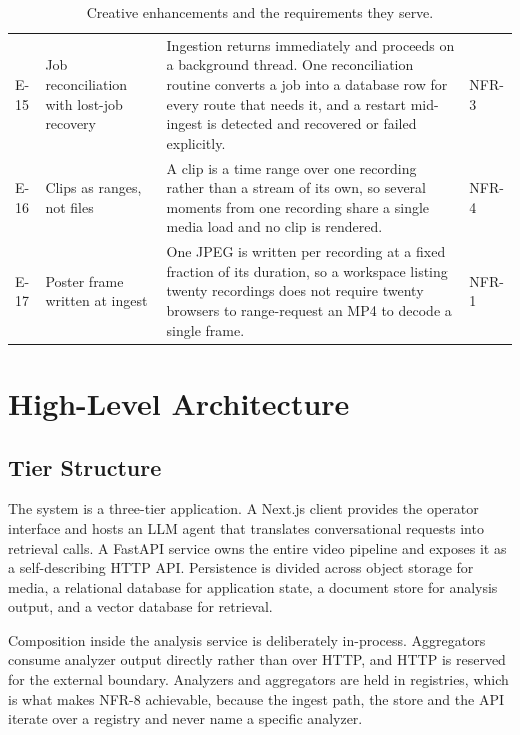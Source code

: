 \documentclass[11pt,a4paper]{article}
\begin{document}
\begin{table}[htbp]
\begin{tabularx}{\textwidth}{@{}lL{3.2cm}XL{1.2cm}@{}}
E-15 & Job reconciliation with lost-job recovery &
Ingestion returns immediately and proceeds on a background thread. One
reconciliation routine converts a job into a database row for every route that
needs it, and a restart mid-ingest is detected and recovered or failed
explicitly. & NFR-3 \\
E-16 & Clips as ranges, not files &
A clip is a time range over one recording rather than a stream of its own, so
several moments from one recording share a single media load and no clip is
rendered. & NFR-4 \\
E-17 & Poster frame written at ingest &
One JPEG is written per recording at a fixed fraction of its duration, so a
workspace listing twenty recordings does not require twenty browsers to
range-request an MP4 to decode a single frame. & NFR-1 \\
\bottomrule
\end{tabularx}
\caption{Creative enhancements and the requirements they serve.}
\end{table}

\section{High-Level Architecture}

\subsection{Tier Structure}

The system is a three-tier application. A Next.js client provides the operator
interface and hosts an LLM agent that translates conversational requests into
retrieval calls. A FastAPI service owns the entire video pipeline and exposes it
as a self-describing HTTP API. Persistence is divided across object storage for
media, a relational database for application state, a document store for
analysis output, and a vector database for retrieval.


Composition inside the analysis service is deliberately in-process. Aggregators
consume analyzer output directly rather than over HTTP, and HTTP is reserved for
the external boundary. Analyzers and aggregators are held in registries, which
is what makes NFR-8 achievable, because the ingest path, the store and the API
iterate over a registry and never name a specific analyzer.
\end{document}
